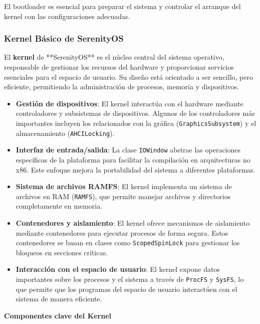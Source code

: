 El bootloader es esencial para preparar el sistema y controlar el arranque del kernel con las configuraciones adecuadas.


\subsubsection{Kernel Básico de SerenityOS}

El \textbf{kernel} de **SerenityOS** es el núcleo central del sistema operativo, responsable de gestionar los recursos del hardware y proporcionar servicios esenciales para el espacio de usuario. Su diseño está orientado a ser sencillo, pero eficiente, permitiendo la administración de procesos, memoria y dispositivos.

\begin{itemize}
  \item \textbf{Gestión de dispositivos}: El kernel interactúa con el hardware mediante controladores y subsistemas de dispositivos. Algunos de los controladores más importantes incluyen los relacionados con la gráfica (\texttt{GraphicsSubsystem}) y el almacenamiento (\texttt{AHCILocking}).
  \item \textbf{Interfaz de entrada/salida}: La clase \texttt{IOWindow} abstrae las operaciones específicas de la plataforma para facilitar la compilación en arquitecturas no x86. Este enfoque mejora la portabilidad del sistema a diferentes plataformas.
  \item \textbf{Sistema de archivos RAMFS}: El kernel implementa un sistema de archivos en RAM (\texttt{RAMFS}), que permite manejar archivos y directorios completamente en memoria.
  \item \textbf{Contenedores y aislamiento}: El kernel ofrece mecanismos de aislamiento mediante contenedores para ejecutar procesos de forma segura. Estos contenedores se basan en clases como \texttt{ScopedSpinLock} para gestionar los bloqueos en secciones críticas.
  \item \textbf{Interacción con el espacio de usuario}: El kernel expone datos importantes sobre los procesos y el sistema a través de \texttt{ProcFS} y \texttt{SysFS}, lo que permite que los programas del espacio de usuario interactúen con el sistema de manera eficiente.
\end{itemize}

\textbf{Componentes clave del Kernel}

